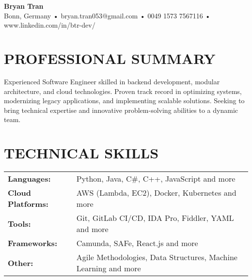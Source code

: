 \documentclass[a4paper,10pt]{article}
\begin{document}
\begin{center}
    \textbf{\LARGE Bryan Tran} \\
    \vspace{2pt}
    \small Bonn, Germany • bryan.tran053@gmail.com • 0049 1573 7567116 • www.linkedin.com/in/btr-dev/
\end{center}
\vspace{8pt}
\section*{\normalsize PROFESSIONAL SUMMARY}
Experienced Software Engineer skilled in backend development, modular architecture, and cloud technologies. Proven track record in optimizing systems, modernizing legacy applications, and implementing scalable solutions. Seeking to bring technical expertise and innovative problem-solving abilities to a dynamic team.
\vspace{5pt}
\section*{\normalsize TECHNICAL SKILLS}
\begin{tabular}{ p{} p{} }
    \textbf{Languages:} & Python, Java, C\#, C++, JavaScript and more \\
    \textbf{Cloud Platforms:} & AWS (Lambda, EC2), Docker, Kubernetes and more \\
    \textbf{Tools:} & Git, GitLab CI/CD, IDA Pro, Fiddler, YAML and more \\
    \textbf{Frameworks:} & Camunda, SAFe, React.js and more \\
    \textbf{Other:} & Agile Methodologies, Data Structures, Machine Learning and more \\
\end{tabular}
\vspace{5pt}
\end{document}
